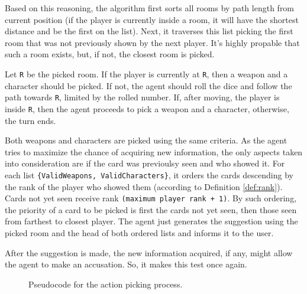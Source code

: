 \documentclass[12pt,a4paper]{article}
\newcommand{\varname}[1]{\texttt{#1}}
\begin{document}
Based on this reasoning, the algorithm first sorts all rooms by path length from current position (if the player is currently inside a room, it will have the shortest distance and be the first on the list). Next, it traverses this list picking the first room that was not previously shown by the next player. It's highly propable that such a room exists, but, if not, the closest room is picked.

Let \varname{R} be the picked room. If the player is currently at \varname{R}, then a weapon and a character should be picked. If not, the agent should roll the dice and follow the path towards \varname{R}, limited by the rolled number. If, after moving, the player is inside \varname{R}, then the agent proceeds to pick a weapon and a character, otherwise, the turn ends.

Both weapons and characters are picked using the same criteria. As the agent tries to maximize the chance of acquiring new information, the only aspects taken into consideration are if the card was previoulsy seen and who showed it. For each list \varname{\{ValidWeapons, ValidCharacters\}}, it orders the cards descending by the
rank of the player who showed them (according to Definition \ref{def:rank}). Cards not yet seen receive rank \varname{(maximum player rank + 1)}. By such ordering, the priority of a card to be picked is first the cards not yet seen, then those seen from farthest to closest player. The agent just generates the suggestion using the picked room and the head of both ordered lists and informs it to the user.

After the suggestion is made, the new information acquired, if any, might allow the agent to make an accusation. So, it makes this test once again.

\begin{figure}[H]
	\centering
    \begin{algorithm}[H]
		\small
	\end{algorithm}
	\caption{Pseudocode for the action picking process.} 
	\label{fig:action-pick}
\end{figure}
\end{document}
